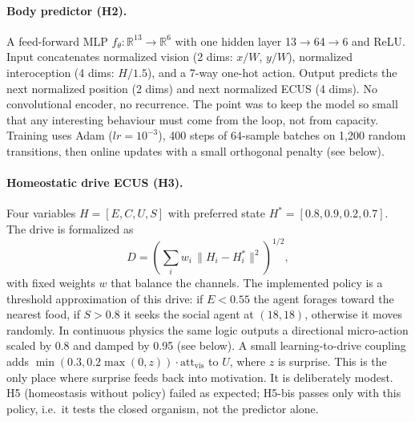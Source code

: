 \documentclass[11pt,a4paper]{article}
\begin{document}
\paragraph{Body predictor (H2).} A feed-forward MLP $f_\theta: \mathbb{R}^{13} \rightarrow \mathbb{R}^{6}$ with one hidden layer 13$\rightarrow$64$\rightarrow$6 and ReLU. Input concatenates normalized vision (2 dims: $x/W$, $y/W$), normalized interoception (4 dims: $H/1.5$), and a 7-way one-hot action. Output predicts the next normalized position (2 dims) and next normalized ECUS (4 dims). No convolutional encoder, no recurrence. The point was to keep the model so small that any interesting behaviour must come from the loop, not from capacity. Training uses Adam ($lr=10^{-3}$), 400 steps of 64-sample batches on 1,200 random transitions, then online updates with a small orthogonal penalty (see below).

\paragraph{Homeostatic drive ECUS (H3).} Four variables $H=[E, C, U, S]$ with preferred state $H^*=[0.8, 0.9, 0.2, 0.7]$. The drive is formalized as
\begin{equation}
D = \left(\sum_i w_i \, \|H_i - H^*_i\|^2 \right)^{1/2},
\end{equation}
with fixed weights $w$ that balance the channels. The implemented policy is a threshold approximation of this drive: if $E < 0.55$ the agent forages toward the nearest food, if $S > 0.8$ it seeks the social agent at $(18,18)$, otherwise it moves randomly. In continuous physics the same logic outputs a directional micro-action scaled by 0.8 and damped by 0.95 (see below). A small learning-to-drive coupling adds $\min(0.3, 0.2\max(0,z)) \cdot \mathrm{att}_{\mathrm{vis}}$ to $U$, where $z$ is surprise. This is the only place where surprise feeds back into motivation. It is deliberately modest. H5 (homeostasis without policy) failed as expected; H5-bis passes only with this policy, i.e.\ it tests the closed organism, not the predictor alone.
\end{document}
